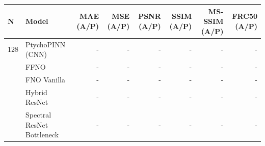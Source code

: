 \begin{tabular}{llrrrrrr}
\toprule
N & Model & MAE (A/P) & MSE (A/P) & PSNR (A/P) & SSIM (A/P) & MS-SSIM (A/P) & FRC50 (A/P) \\
\midrule
128 & PtychoPINN (CNN) & - & - & - & - & - & - \\
 & FFNO & - & - & - & - & - & - \\
 & FNO Vanilla & - & - & - & - & - & - \\
 & Hybrid ResNet & - & - & - & - & - & - \\
 & Spectral ResNet Bottleneck & - & - & - & - & - & - \\
\bottomrule
\end{tabular}
